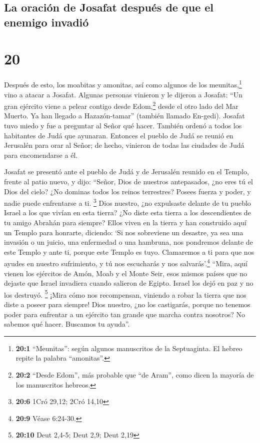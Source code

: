\hypertarget{la-oraciuxf3n-de-josafat-despuuxe9s-de-que-el-enemigo-invadiuxf3}{%
\subsection{La oración de Josafat después de que el enemigo
invadió}\label{la-oraciuxf3n-de-josafat-despuuxe9s-de-que-el-enemigo-invadiuxf3}}

\hypertarget{section-19}{%
\section{20}\label{section-19}}

 Después de esto, los moabitas y amonitas, así como
algunos de los meunitas,\footnote{\textbf{20:1} ``Meunitas'': según
  algunos manuscritos de la Septuaginta. El hebreo repite la palabra
  ``amonitas''.} vino a atacar a Josafat.  Algunas
personas vinieron y le dijeron a Josafat: ``Un gran ejército viene a
pelear contigo desde Edom,\footnote{\textbf{20:2} ``Desde Edom'', más
  probable que ``de Aram'', como dicen la mayoría de los manuscritos
  hebreos.} desde el otro lado del Mar Muerto. Ya han llegado a
Hazazón-tamar'' (también llamado En-gedi).  Josafat tuvo
miedo y fue a preguntar al Señor qué hacer. También ordenó a todos los
habitantes de Judá que ayunaran.  Entonces el pueblo de
Judá se reunió en Jerusalén para orar al Señor; de hecho, vinieron de
todas las ciudades de Judá para encomendarse a él.

 Josafat se presentó ante el pueblo de Judá y de Jerusalén
reunido en el Templo, frente al patio nuevo,  y dijo:
``Señor, Dios de nuestros antepasados, ¿no eres tú el Dios del cielo?
¿No dominas todos los reinos terrestres? Posees fuerza y poder, y nadie
puede enfrentarse a ti. \footnote{\textbf{20:6} 1Cró 29,12; 2Cró 14,10}
 Dios nuestro, ¿no expulsaste delante de tu pueblo Israel
a los que vivían en esta tierra? ¿No diste esta tierra a los
descendientes de tu amigo Abrahán para siempre?  Ellos
viven en la tierra y han construido aquí un Templo para honrarte,
diciendo:  `Si nos sobreviene un desastre, ya sea una
invasión o un juicio, una enfermedad o una hambruna, nos pondremos
delante de este Templo y ante ti, porque este Templo es tuyo. Clamaremos
a ti para que nos ayudes en nuestro sufrimiento, y tú nos escucharás y
nos salvarás'.\footnote{\textbf{20:9} Véase 6:24-30.} 
``Mira, aquí vienen los ejércitos de Amón, Moab y el Monte Seir, esos
mismos países que no dejaste que Israel invadiera cuando salieron de
Egipto. Israel los dejó en paz y no los destruyó. \footnote{\textbf{20:10}
  Deut 2,4-5; Deut 2,9; Deut 2,19}  ¡Mira cómo nos
recompensan, viniendo a robar la tierra que nos diste a poseer para
siempre!  Dios nuestro, ¿no los castigarás, porque no
tenemos poder para enfrentar a un ejército tan grande que marcha contra
nosotros? No sabemos qué hacer. Buscamos tu ayuda''.

